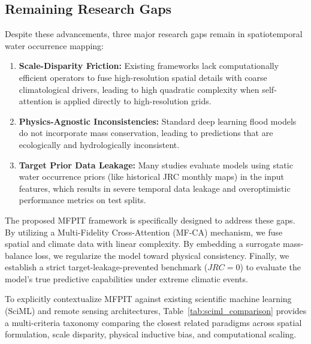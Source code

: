 \documentclass[journal]{IEEEtran}
\begin{document}
\subsection{Remaining Research Gaps}
Despite these advancements, three major research gaps remain in spatiotemporal water occurrence mapping:
\begin{enumerate}
    \item \textbf{Scale-Disparity Friction:} Existing frameworks lack computationally efficient operators to fuse high-resolution spatial details with coarse climatological drivers, leading to high quadratic complexity when self-attention is applied directly to high-resolution grids.
    \item \textbf{Physics-Agnostic Inconsistencies:} Standard deep learning flood models do not incorporate mass conservation, leading to predictions that are ecologically and hydrologically inconsistent.
    \item \textbf{Target Prior Data Leakage:} Many studies evaluate models using static water occurrence priors (like historical JRC monthly maps) in the input features, which results in severe temporal data leakage and overoptimistic performance metrics on test splits.
\end{enumerate}
The proposed MFPIT framework is specifically designed to address these gaps. By utilizing a Multi-Fidelity Cross-Attention (MF-CA) mechanism, we fuse spatial and climate data with linear complexity. By embedding a surrogate mass-balance loss, we regularize the model toward physical consistency. Finally, we establish a strict target-leakage-prevented benchmark ($JRC=0$) to evaluate the model's true predictive capabilities under extreme climatic events.

To explicitly contextualize MFPIT against existing scientific machine learning (SciML) and remote sensing architectures, Table~\ref{tab:sciml_comparison} provides a multi-criteria taxonomy comparing the closest related paradigms across spatial formulation, scale disparity, physical inductive bias, and computational scaling.
\end{document}
